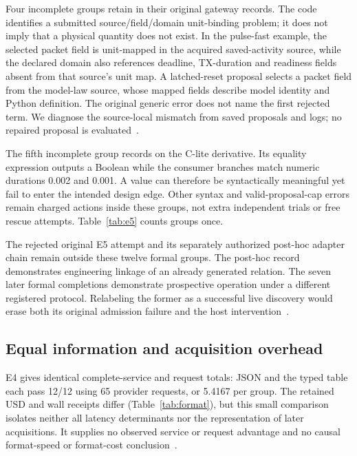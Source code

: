 

Four incomplete groups retain  in their
original gateway records. The code identifies a submitted source/field/domain
unit-binding problem; it does not imply that a physical quantity does not
exist. In the pulse-fast example, the selected packet field
 is unit-mapped in the acquired
saved-activity source, while the declared domain also references deadline,
TX-duration and readiness fields absent from that source's unit map.
A latched-reset proposal selects a packet field from the model-law source,
whose mapped fields describe model identity and Python definition.
The original generic error does not name the first rejected term.
We diagnose the source-local mismatch from saved proposals and logs;
no repaired proposal is evaluated~\cite{gateways}.

The fifth incomplete group records  on
the C-lite derivative. Its equality expression outputs a Boolean while
the consumer branches match numeric durations 0.002 and 0.001. A value
can therefore be syntactically meaningful yet fail to enter the intended
design edge. Other syntax and valid-proposal-cap errors remain charged
actions inside these groups, not extra independent trials or free
rescue attempts. Table~\ref{tab:e5} counts groups once.

The rejected original E5 attempt and its separately authorized post-hoc
adapter chain remain outside these twelve formal groups. The post-hoc
record demonstrates engineering linkage of an already generated relation.
The seven later formal completions demonstrate prospective operation
under a different registered protocol. Relabeling the former as a
successful live discovery would erase both its original admission
failure and the host intervention~\cite{original,posthoc}.

\subsection{Equal information and acquisition overhead}
E4 gives identical complete-service and request totals: JSON and the
typed table each pass 12/12 using 65 provider requests, or 5.4167 per
group. The retained USD and wall receipts differ
(Table~\ref{tab:format}), but this small comparison isolates neither
all latency determinants nor the representation of later acquisitions.
It supplies no observed service or request advantage and no causal
format-speed or format-cost conclusion~\cite{tables}.

